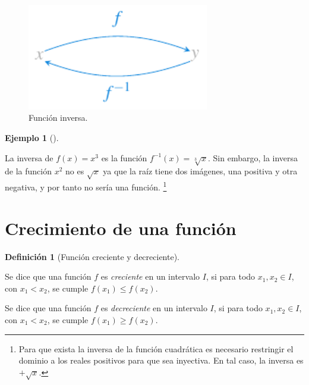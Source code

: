 \documentclass[
  a4paper,
]{scrreport}
\theoremstyle{definition}
\newtheorem{example}{Ejemplo}[chapter]
\theoremstyle{plain}
\theoremstyle{definition}
\newtheorem{definition}{Definición}[chapter]
\theoremstyle{definition}
\theoremstyle{plain}
\theoremstyle{plain}
\theoremstyle{remark}
\begin{document}
\begin{figure}[H]

{\centering \includegraphics[width=3.125in,height=\textheight]{./img/funciones/funcion-inversa.pdf}

}

\caption{Función inversa.}

\end{figure}%

\begin{example}[]\protect\hypertarget{exm-funcion-inversa}{}\label{exm-funcion-inversa}

La inversa de \(f(x)=x^3\) es la función \(f^{-1}(x)=\sqrt[3]{x}.\) Sin
embargo, la inversa de la función \(x^2\) no es \(\sqrt{x}\) ya que la
raíz tiene dos imágenes, una positiva y otra negativa, y por tanto no
sería una función. \footnote{Para que exista la inversa de la función
  cuadrática es necesario restringir el dominio a los reales positivos
  para que sea inyectiva. En tal caso, la inversa es \(+\sqrt{x}\).}

\end{example}

\section{Crecimiento de una
función}\label{crecimiento-de-una-funciuxf3n}

\begin{definition}[Función creciente y
decreciente]\protect\hypertarget{def-crecimiento-funcion}{}\label{def-crecimiento-funcion}

Se dice que una función \(f\) es \emph{creciente} en un intervalo \(I\),
si para todo \(x_1,x_2\in I\), con \(x_1<x_2\), se cumple
\(f(x_1)\leq f(x_2)\).

Se dice que una función \(f\) es \emph{decreciente} en un intervalo
\(I\), si para todo \(x_1,x_2\in I\), con \(x_1<x_2\), se cumple
\(f(x_1)\geq f(x_2)\).

\end{definition}
\end{document}
